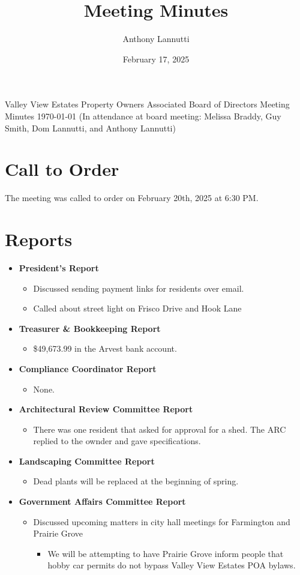 \documentclass[10pt,a4paper]{article}
\author{Anthony Lannutti}
\date{February 17, 2025}
\title{Meeting Minutes}
\begin{document}
\begin{center}
  Valley View Estates Property Owners Associated Board of Directors Meeting Minutes\break{}
  \today{}\break{}
  (In attendance at board meeting: Melissa Braddy, Guy Smith, Dom Lannutti, and Anthony Lannutti)
\end{center}

\section*{Call to Order}
\begin{flushleft}
The meeting was called to order on February 20th, 2025 at 6:30 PM\@.
\end{flushleft}


\section*{Reports}
\begin{itemize}
  \item \textbf{President's Report}
  \begin{itemize}
    \item Discussed sending payment links for residents over email.
    \item Called about street light on Frisco Drive and Hook Lane
  \end{itemize}
  \item \textbf{Treasurer \& Bookkeeping Report}
  \begin{itemize}
    \item \$49,673.99 in the Arvest bank account.
  \end{itemize}
  \item \textbf{Compliance Coordinator Report}
  \begin{itemize}
    \item None.
  \end{itemize}
  \item \textbf{Architectural Review Committee Report}
  \begin{itemize}
    \item There was one resident that asked for approval for a shed. The ARC replied to the ownder and gave specifications.
  \end{itemize}
  \item \textbf{Landscaping Committee Report}
  \begin{itemize}
    \item Dead plants will be replaced at the beginning of spring.
  \end{itemize}
  \item \textbf{Government Affairs Committee Report}
  \begin{itemize}
    \item Discussed upcoming matters in city hall meetings for Farmington and Prairie Grove
    \begin{itemize}
      \item We will be attempting to have Prairie Grove inform people that hobby car permits do not bypass Valley View Estates POA bylaws.
    \end{itemize}
  \end{itemize}
\end{itemize}
\end{document}
